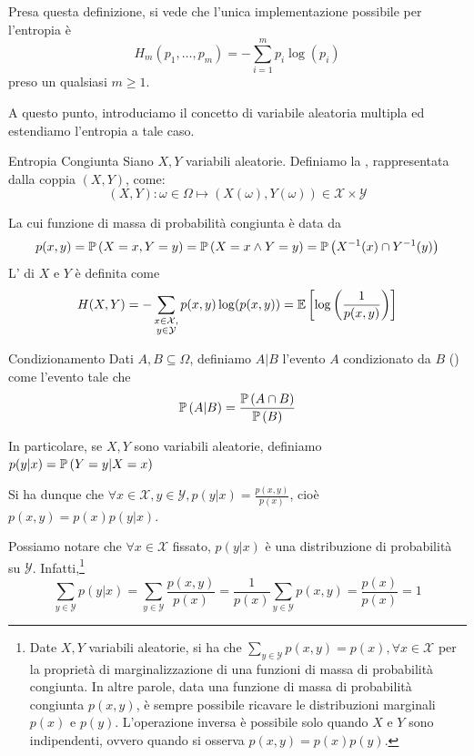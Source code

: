 Presa questa definizione, si vede che l'unica implementazione possibile per l'entropia è \[H_m(p_1,\ldots,p_m) = - \sum_{i=1}^{m} p_i \log(p_i)\] preso un qualsiasi \(m\geq 1\).

A questo punto, introduciamo il concetto di variabile aleatoria multipla ed estendiamo l'entropia a tale caso.

\begin{definition}{Entropia Congiunta}
  Siano \(X, Y\) variabili aleatorie. Definiamo la , rappresentata dalla coppia \((X,Y)\), come:
  \[(X,Y): \omega \in \Omega \mapsto (X(\omega), Y(\omega)) \in \mathcal{X} \times \mathcal{Y}\]
  
  La cui funzione di massa di probabilità congiunta è data da
  \[p(x,y) = \Prob[X=x, Y=y] = \Prob[X=x \land Y=y] = \Prob[X^{-1}(x) \cap Y^{-1}(y)]\]
  L' di \(X\) e \(Y\) è definita come
  \[H(X,Y) = - \sum_{\substack{x \in \mathcal{X},\\ y \in \mathcal{Y}}} p(x,y) \log(p(x,y)) = \EV{\log\left(\frac{1}{p(x,y)}\right)}\]
\end{definition}

\begin{definition}{Condizionamento}
  Dati \(A,B \subseteq \Omega\), definiamo \(A|B\) l'evento \(A\) condizionato da \(B\) () come l'evento tale che
  \[\Prob[A|B] = \frac{\Prob[A \cap B]}{\Prob[B]}\]

  In particolare, se \(X,Y\) sono variabili aleatorie, definiamo \(p(y|x) = \Prob[Y=y|X=x]\)

  Si ha dunque che \(\forall x \in \mathcal{X}, y \in \mathcal{Y}, p(y|x) = \frac{p(x,y)}{p(x)}\), cioè \(p(x,y) = p(x)p(y|x)\).
\end{definition}

Possiamo notare che  \(\forall x \in \mathcal{X}\) fissato, \(p(y|x)\) è una distribuzione di probabilità su \(\mathcal{Y}\).
Infatti,\footnote{Date \(X,Y\) variabili aleatorie, si ha che \(\sum_{y \in \mathcal{Y}} p(x,y) = p(x), \forall x \in \mathcal{X}\) per la proprietà di marginalizzazione di una funzioni di massa di probabilità congiunta.
In altre parole, data una funzione di massa di probabilità congiunta \(p(x,y)\), è sempre possibile ricavare le distribuzioni marginali $p(x)$ e $p(y)$. L'operazione inversa è possibile solo quando $X$ e $Y$ sono indipendenti, ovvero quando si osserva $p(x,y)=p(x)p(y)$.}
\[\sum_{y \in \mathcal{Y}} p(y|x) = \sum_{y \in \mathcal{Y}} \frac{p(x,y)}{p(x)} = \frac{1}{p(x)} \sum_{y \in \mathcal{Y}} p(x,y) = \frac{p(x)}{p(x)} = 1\]

